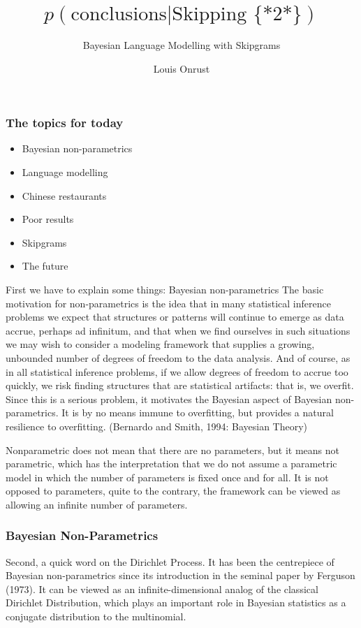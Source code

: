 \documentclass{beamer}
\author{Louis Onrust}
\title{$p(\text{conclusions} | \text{Skipping \{*2*\}})$}
\subtitle{Bayesian Language Modelling with Skipgrams}
\date{}
\begin{document}
\begin{frame}
	\titlepage
\end{frame}

\begin{frame}
    \frametitle{The topics for today}
    \begin{itemize}
        \item Bayesian non-parametrics
        \item Language modelling
        \item Chinese restaurants
        \item Poor results
        \item Skipgrams
        \item The future
    \end{itemize}
\end{frame}

First we have to explain some things:
Bayesian non-parametrics
    The basic motivation for non-parametrics is the idea that in many statistical inference problems we expect that structures or patterns will continue to emerge as data accrue, perhaps ad infinitum, and that when we find ourselves in such situations we may wish to consider a modeling framework that supplies a growing, unbounded number of degrees of freedom to the data analysis. And of course, as in all statistical inference problems, if we allow degrees of freedom to accrue too quickly, we risk finding structures that are statistical artifacts: that is, we overfit. Since this is a serious problem, it motivates the Bayesian aspect of Bayesian non-parametrics. It is by no means immune to overfitting, but provides a natural resilience to overfitting. (Bernardo and Smith, 1994: Bayesian Theory)

Nonparametric does not mean that there are no parameters, but it means not parametric, which has the interpretation that we do not assume a parametric model in which the number of parameters is fixed once and for all. It is not opposed to parameters, quite to the contrary, the framework can be viewed as allowing an infinite number of parameters.

\begin{frame}
    \frametitle{Bayesian Non-Parametrics}

\end{frame}

Second, a quick word on the Dirichlet Process. It has been the centrepiece of Bayesian non-parametrics since its introduction in the seminal paper by Ferguson (1973). It can be viewed as an infinite-dimensional analog of the classical Dirichlet Distribution, which plays an important role in Bayesian statistics as a conjugate distribution to the multinomial.
\end{document}
